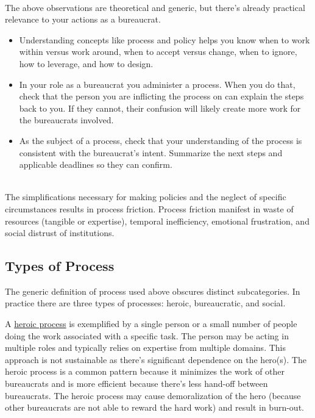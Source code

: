 \ \\

The above observations are theoretical and generic, but there's already practical relevance to your actions as a bureaucrat.
\begin{itemize}
    \item Understanding concepts like process and policy helps you know when to work within versus work around, when to accept versus change, when to ignore, how to leverage, and how to design.
    \item In your role as a bureaucrat you administer a process. When you do that, check that the person you are inflicting the process on can explain the steps back to you. If they cannot, their confusion will likely create more work for the bureaucrats involved. 
    \item As the subject of a process, check that your understanding of the process is consistent with the bureaucrat's intent. Summarize the next steps and applicable deadlines so they can confirm. 
\end{itemize}

\ \\

The simplifications necessary for making policies and the neglect of specific circumstances results in \gls{process friction}. Process friction manifest in waste of resources (tangible or expertise), temporal inefficiency, emotional frustration, and social distrust of institutions.



\subsection*{Types of Process}
The generic definition of \gls{process} used above obscures distinct subcategories. In practice there are three types of processes: heroic, bureaucratic, and social.

A \underline{heroic process} is exemplified by a single person or a small number of people doing the work associated with a specific task. The person may be acting in multiple roles and typically relies on expertise from multiple domains. This approach is not sustainable as there's significant dependence on the hero(s). The heroic process is a common pattern because it minimizes the work of other bureaucrats and is more efficient because there's less hand-off between bureaucrats. The heroic process may cause demoralization of the hero (because other bureaucrats are not able to reward the hard work) and result in burn-out. 

